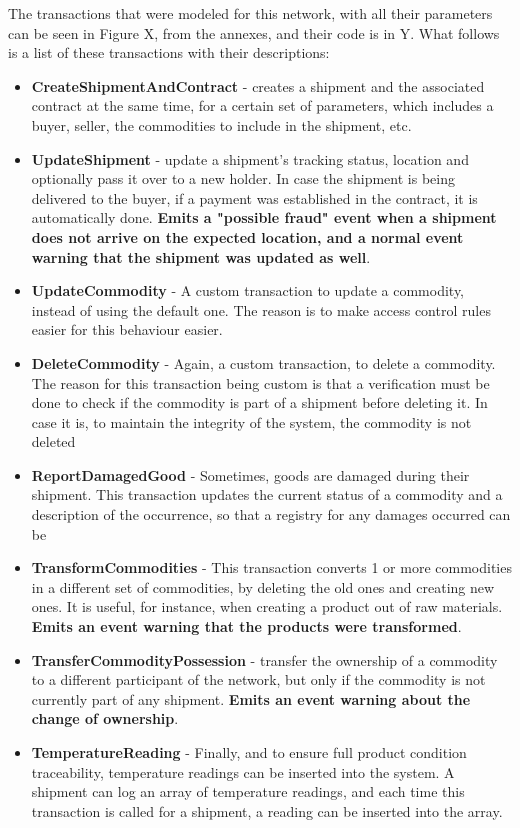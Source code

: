 The transactions that were modeled for this network, with all their parameters can be seen in Figure X, from the annexes, and their code is in Y. What follows is a list of these transactions with their descriptions:
\begin{itemize}
    \item \textbf{CreateShipmentAndContract} - creates a shipment and the associated contract at the same time, for a certain set of parameters, which includes a buyer, seller, the commodities to include in the shipment, etc.
    \item \textbf{UpdateShipment} - update a shipment's tracking status, location and optionally pass it over to a new holder. In case the shipment is being delivered to the buyer, if a payment was established in the contract, it is automatically done. \textbf{Emits a "possible fraud" event when a shipment does not arrive on the expected location, and a normal event warning that the shipment was updated as well}.
    \item \textbf{UpdateCommodity} - A custom transaction to update a commodity, instead of using the default one. The reason is to make access control rules easier for this behaviour easier.
    \item \textbf{DeleteCommodity} - Again, a custom transaction, to delete a commodity. The reason for this transaction being custom is that a verification must be done to check if the commodity is part of a shipment before deleting it. In case it is, to maintain the integrity of the system, the commodity is not deleted
    \item \textbf{ReportDamagedGood} - Sometimes, goods are damaged during their shipment. This transaction updates the current status of a commodity and a description of the occurrence, so that a registry for any damages occurred can be
    \item \textbf{TransformCommodities} - This transaction converts 1 or more commodities in a different set of commodities, by deleting the old ones and creating new ones. It is useful, for instance, when creating a product out of raw materials. \textbf{Emits an event warning that the products were transformed}.
    \item \textbf{TransferCommodityPossession} - transfer the ownership of a commodity to a different participant of the network, but only if the commodity is not currently part of any shipment. \textbf{Emits an event warning about the change of ownership}.
    \item \textbf{TemperatureReading} - Finally, and to ensure full product condition traceability, temperature readings can be inserted into the system. A shipment can log an array of temperature readings, and each time this transaction is called for a shipment, a reading can be inserted into the array.
\end{itemize}

